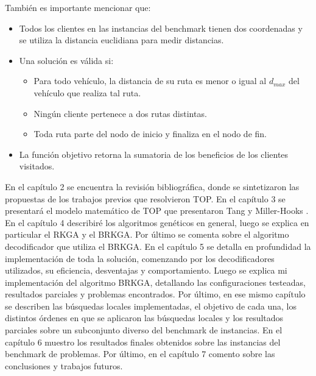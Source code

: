 \begin{minipage}{\textwidth}
También es importante mencionar que:

\begin{itemize}
	\item Todos los clientes en las instancias del benchmark tienen dos coordenadas y se utiliza la distancia euclidiana para medir distancias.
	\item Una solución es válida si:
	\begin{itemize}
		\item Para todo vehículo, la distancia de su ruta es menor o igual al $d_{max}$ del vehículo que realiza tal ruta.
		\item Ningún cliente pertenece a dos rutas distintas.
		\item Toda ruta parte del nodo de inicio y finaliza en el nodo de fin.
	\end{itemize}
	\item La función objetivo retorna la sumatoria de los beneficios de los clientes visitados.
\end{itemize}
\end{minipage}

\bigskip

En el capítulo 2 se encuentra la revisión bibliográfica, donde se sintetizaron las propuestas de los trabajos previos que resolvieron TOP.
En el capítulo 3 se presentará el modelo matemático de TOP que presentaron Tang y Miller-Hooks \cite{TangMillerHooks} .
En el capítulo 4 describiré los algoritmos genéticos en general, luego se explica en particular el RKGA y el BRKGA. Por último se comenta sobre el algoritmo decodificador que utiliza el BRKGA.
En el capítulo 5 se detalla en profundidad la implementación de toda la solución, comenzando por los decodificadores utilizados, su eficiencia, desventajas y comportamiento. Luego se explica mi implementación del algoritmo BRKGA, detallando las configuraciones testeadas, resultados parciales y problemas encontrados. Por último, en ese mismo capítulo se describen las búsquedas locales implementadas, el objetivo de cada una, los distintos órdenes en que se aplicaron las búsquedas locales y los resultados parciales sobre un subconjunto diverso del benchmark de instancias.
En el capítulo 6 muestro los resultados finales obtenidos sobre las instancias del benchmark de problemas.
Por último, en el capítulo 7 comento sobre las conclusiones y trabajos futuros.


























